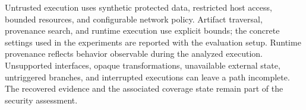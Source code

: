 Untrusted execution uses synthetic protected data, restricted host access,
bounded resources, and configurable network policy. Artifact traversal,
provenance search, and runtime execution use explicit bounds; the concrete
settings used in the experiments are reported with the evaluation setup.
Runtime provenance reflects behavior observable during the analyzed execution.
Unsupported interfaces, opaque transformations, unavailable external state,
untriggered branches, and interrupted executions can leave a path incomplete.
The recovered evidence and the associated coverage state remain part of the
security assessment.